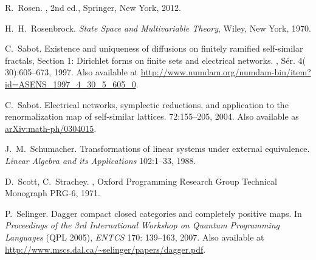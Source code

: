 \begin{thebibliography}{RSW00}
    R.\ Rosen.
    , 2nd ed., Springer, New York, 2012.

    H.\ H.\ Rosenbrock.
    \newblock \emph{State Space and Multivariable Theory},
    Wiley, New York, 1970. 


    C.\ Sabot.
    \newblock Existence and uniqueness of diffusions on
    finitely ramified self-similar fractals, Section 1: Dirichlet forms on
    finite sets and electrical networks.
    , S\'er. 4({ 30}):605--673, 1997.
    \newblock Also available at
    \href{http://www.numdam.org/numdam-bin/item?id=ASENS_1997_4_30_5_605_0}{http://www.numdam.org/numdam-bin/item?id=ASENS\_1997\_4\_30\_5\_605\_0}.

    C.\ Sabot.
    \newblock Electrical networks, symplectic reductions, and
    application to the renormalization map of self-similar lattices.
     { 72}:155--205, 2004.
    \newblock Also available as
    \href{http://arxiv.org/abs/math-ph/0304015}{arXiv:math-ph/0304015}.

    J.\ M.\ Schumacher.
    \newblock Transformations of linear systems under
    external equivalence.
    \newblock \emph{Linear Algebra and its Applications} 102:1--33, 1988.

    D.\ Scott, C.\ Strachey.
    ,
    Oxford Programming Research Group Technical Monograph PRG-6, 1971.


    P.\ Selinger.
    \newblock Dagger compact closed categories and completely
    positive maps.
    \newblock In {\sl Proceedings of the 3rd International Workshop on
    Quantum Programming Languages} (QPL 2005), {\sl ENTCS} { 170}:
    139--163, 2007.
    \newblock Also available at
    \href{http://www.mscs.dal.ca/~selinger/papers/dagger.pdf}{http://www.mscs.dal.ca/\~{}selinger/papers/dagger.pdf}.


\end{thebibliography}
